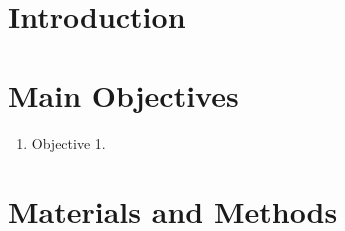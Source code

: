 \documentclass[a0,portrait]{a0poster}
\begin{document}
\begin{multicols}{2} %


	\color{ku} %

	\begin{abstract}

	\end{abstract}


	\color{DarkRed} %

	\section*{Introduction}



	\color{DarkSlateGray} %

	\section*{Main Objectives}

	\begin{enumerate}
		\item Objective 1.
	\end{enumerate}


	\section*{Materials and Methods}



\end{multicols}
\end{document}
